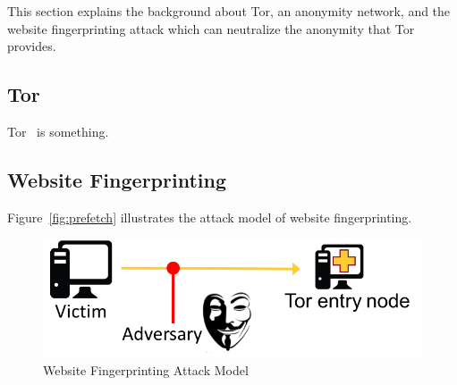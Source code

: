 
This section explains the background about Tor, an anonymity network, and the website fingerprinting attack which can neutralize the anonymity that Tor provides.

\subsection{Tor}
Tor~\cite{dingledine2004tor} is something.

\subsection{Website Fingerprinting}

Figure~\ref{fig:prefetch} illustrates the attack model of website fingerprinting.

\begin{figure}[h]
\includegraphics[width=0.7\columnwidth]{figures/attack_model.png}
\centering
\caption{Website Fingerprinting Attack Model}
\label{fig:attack}
\end{figure}


